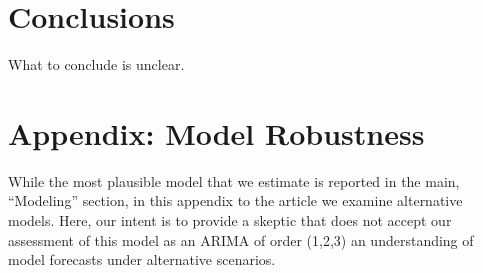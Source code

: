 \documentclass[AER]{AEA}
\begin{document}
\hypertarget{conclusions}{%
\section{Conclusions}\label{conclusions}}

What to conclude is unclear.




\appendix
\section{Appendix: Model Robustness}

While the most plausible model that we estimate is reported in the main,
``Modeling'' section, in this appendix to the article we examine
alternative models. Here, our intent is to provide a skeptic that does
not accept our assessment of this model as an ARIMA of order (1,2,3) an
understanding of model forecasts under alternative scenarios.
\end{document}
